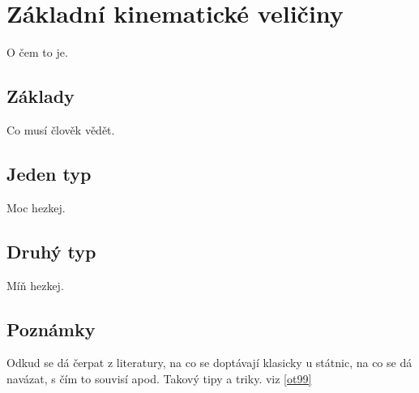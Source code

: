 \section{Základní kinematické veličiny} 
O čem to je.

\subsection*{Základy}
Co musí člověk vědět.

\subsection*{Jeden typ}
Moc hezkej.

\subsection*{Druhý typ}
Míň hezkej.

\subsection*{Poznámky}
Odkud se dá čerpat z literatury, na co se doptávají klasicky u státnic, na co se dá navázat, s čím to souvisí apod. Takový tipy a triky. viz \ref{ot99}